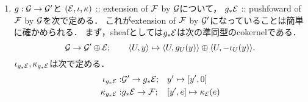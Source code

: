 \documentclass[a4paper]{jsarticle}
\makeatletter
\newcommand{\centerpb}{\ar@{}[lu]|{\text{p.b.}}}
\newcommand{\centerpo}{\ar@{}[lu]|{\text{p.o.}}}
\makeatother
\begin{document}
\begin{Def}
\begin{enumerate}[label=(\roman*), leftmargin=*]
        \item
            $g: \mathcal{G} \to \mathcal{G}'$と
            $(\mathcal{E}, \iota, \kappa)$ :: extension of $\mathcal{F}$ by $\mathcal{G}$について，
            $g_* \mathcal{E}$ :: pushfoward of $\mathcal{F}$ by $\mathcal{G}$を次で定める．
            これがextension of $\mathcal{F}$ by $\mathcal{G}'$になっていることは簡単に確かめられる．
            まず，sheafとしては$g_* \mathcal{E}$は次の準同型のcokernelである．
            \[
                \mathcal{G} \to \mathcal{G}' \oplus \mathcal{E};
                \qquad
                \langle U,y \rangle \mapsto \langle U,g_U(y) \rangle \oplus \langle U,-\iota_U(y) \rangle.
            \]
            $\iota_{g_*\mathcal{E}}, \kappa_{g_*\mathcal{E}}$は次で定める．
            \begin{align*}
                \iota_{g_*\mathcal{E}}:& \mathcal{G}' \to g_*\mathcal{E}; && y' \mapsto [y', 0] \\
                \kappa_{g_*\mathcal{E}}:& g_*\mathcal{E} \to \mathcal{F}; && [y', e] \mapsto \kappa_{\mathcal{E}}(e)
            \end{align*}
    \end{enumerate}
    \end{Def}

\end{document}
